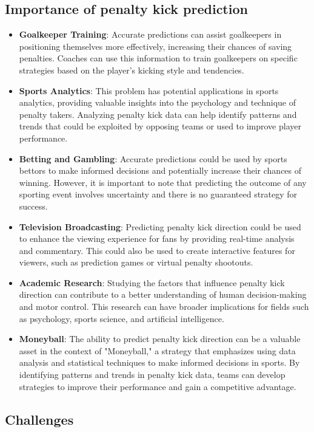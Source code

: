 \documentclass{article}
\begin{document}
\subsection{Importance of penalty kick prediction}
\begin{itemize}
    \item {\bf Goalkeeper Training}: Accurate predictions can assist goalkeepers in positioning themselves more effectively, increasing their chances of saving penalties. Coaches can use this information to train goalkeepers on specific strategies based on the player's kicking style and tendencies.
    \item {\bf Sports Analytics}: This problem has potential applications in sports analytics, providing valuable insights into the psychology and technique of penalty takers. Analyzing penalty kick data can help identify patterns and trends that could be exploited by opposing teams or used to improve player performance.
    \item {\bf Betting and Gambling}: Accurate predictions could be used by sports bettors to make informed decisions and potentially increase their chances of winning. However, it is important to note that predicting the outcome of any sporting event involves uncertainty and there is no guaranteed strategy for success.
    \item {\bf Television Broadcasting}: Predicting penalty kick direction could be used to enhance the viewing experience for fans by providing real-time analysis and commentary. This could also be used to create interactive features for viewers, such as prediction games or virtual penalty shootouts.
    \item {\bf Academic Research}: Studying the factors that influence penalty kick direction can contribute to a better understanding of human decision-making and motor control. This research can have broader implications for fields such as psychology, sports science, and artificial intelligence.
    \item {\bf Moneyball}: The ability to predict penalty kick direction can be a valuable asset in the context of "Moneyball," a strategy that emphasizes using data analysis and statistical techniques to make informed decisions in sports. By identifying patterns and trends in penalty kick data, teams can develop strategies to improve their performance and gain a competitive advantage.
\end{itemize}

\subsection{Challenges}
\end{document}
